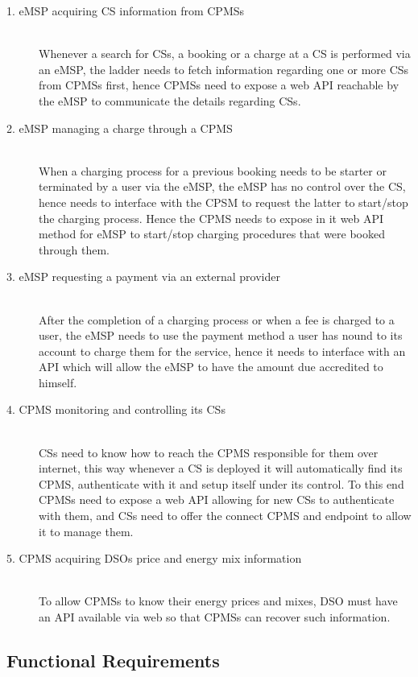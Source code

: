 \documentclass[11pt]{article}
\begin{document}
\begin{description}
    \item [1. eMSP acquiring CS information from CPMSs] \hfill \\
        Whenever a search for CSs, a booking or a charge at a CS is performed via an eMSP, the ladder needs to fetch information regarding one or more CSs from CPMSs first, hence CPMSs need to expose a web API reachable by the eMSP to communicate the details regarding CSs.
    \item [2. eMSP  managing a charge through a CPMS] \hfill \\
        When a charging process for a previous booking needs to be starter or terminated by a user via the eMSP, the eMSP has no control over the CS, hence needs to interface with the CPSM to request the latter to start/stop the charging process. Hence the CPMS needs to expose in it web API method for eMSP to start/stop charging procedures that were booked through them.
    \item [3. eMSP requesting a payment via an external provider] \hfill \\
        After the completion of a charging process or when a fee is charged to a user, the eMSP needs to use the payment method a user has nound to its account to charge them for the service, hence it needs to interface with an API which will allow the eMSP to have the amount due accredited to himself.
    \item [4. CPMS monitoring and controlling its CSs] \hfill \\
        CSs need to know how to reach the CPMS responsible for them over internet, this way whenever a CS is deployed it will automatically find its CPMS, authenticate with it and setup itself under its control. To this end CPMSs need to expose a web API allowing for new CSs to authenticate with them, and CSs need to offer the connect CPMS and endpoint to allow it to manage them.
    \item [5. CPMS acquiring DSOs price and energy mix information] \hfill \\
        To allow CPMSs to know their energy prices and mixes, DSO must have an API available via web so that CPMSs can recover such information.
\end{description}

\subsection{Functional Requirements}
\end{document}
